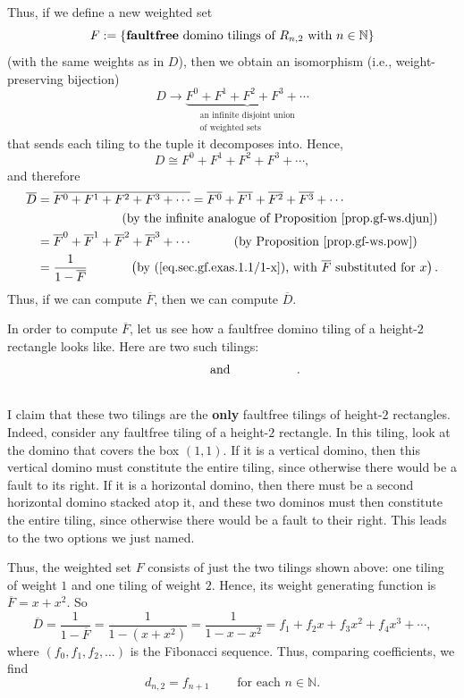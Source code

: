 Thus, if we define a new weighted set%
\[
F:=\left\{  \text{\textbf{faultfree} domino tilings of }R_{n,2}\text{ with
}n\in\mathbb{N}\right\}
\]
(with the same weights as in $D$), then we obtain an isomorphism (i.e.,
weight-preserving bijection)%
\[
D\rightarrow\underbrace{F^{0}+F^{1}+F^{2}+F^{3}+\cdots}_{\substack{\text{an
infinite disjoint union}\\\text{of weighted sets}}}
\]
that sends each tiling to the tuple it decomposes into. Hence,%
\[
D\cong F^{0}+F^{1}+F^{2}+F^{3}+\cdots,
\]
and therefore%
\begin{align*}
\overline{D}  &  =\overline{F^{0}+F^{1}+F^{2}+F^{3}+\cdots}=\overline{F^{0}%
}+\overline{F^{1}}+\overline{F^{2}}+\overline{F^{3}}+\cdots\\
&  \ \ \ \ \ \ \ \ \ \ \ \ \ \ \ \ \ \ \ \ \left(  \text{by the infinite
analogue of Proposition \ref{prop.gf-ws.djun}}\right) \\
&  =\overline{F}^{0}+\overline{F}^{1}+\overline{F}^{2}+\overline{F}^{3}%
+\cdots\ \ \ \ \ \ \ \ \ \ \left(  \text{by Proposition \ref{prop.gf-ws.pow}%
}\right) \\
&  =\dfrac{1}{1-\overline{F}}\ \ \ \ \ \ \ \ \ \ \left(  \text{by
(\ref{eq.sec.gf.exas.1.1/1-x}), with }\overline{F}\text{ substituted for
}x\right)  .
\end{align*}
Thus, if we can compute $\overline{F}$, then we can compute $\overline{D}$.

In order to compute $\overline{F}$, let us see how a faultfree domino tiling
of a height-$2$ rectangle looks like. Here are two such tilings:%
\[
\raisebox{-3.5ex}{
}\ \ \ \ \ \ \ \ \ \ \text{and}\ \ \ \ \ \ \ \ \ \ \raisebox{-3.5ex}{
}\ \ \ \ \ .
\]


I claim that these two tilings are the \textbf{only} faultfree tilings of
height-$2$ rectangles. Indeed, consider any faultfree tiling of a height-$2$
rectangle. In this tiling, look at the domino that covers the box $\left(
1,1\right)  $. If it is a vertical domino, then this vertical domino must
constitute the entire tiling, since otherwise there would be a fault to its
right. If it is a horizontal domino, then there must be a second horizontal
domino stacked atop it, and these two dominos must then constitute the entire
tiling, since otherwise there would be a fault to their right. This leads to
the two options we just named.

Thus, the weighted set $F$ consists of just the two tilings shown above: one
tiling of weight $1$ and one tiling of weight $2$. Hence, its weight
generating function is $\overline{F}=x+x^{2}$. So%
\[
\overline{D}=\dfrac{1}{1-\overline{F}}=\dfrac{1}{1-\left(  x+x^{2}\right)
}=\dfrac{1}{1-x-x^{2}}=f_{1}+f_{2}x+f_{3}x^{2}+f_{4}x^{3}+\cdots,
\]
where $\left(  f_{0},f_{1},f_{2},\ldots\right)  $ is the Fibonacci sequence.
Thus, comparing coefficients, we find%
\[
d_{n,2}=f_{n+1}\ \ \ \ \ \ \ \ \ \ \text{for each }n\in\mathbb{N}.
\]


